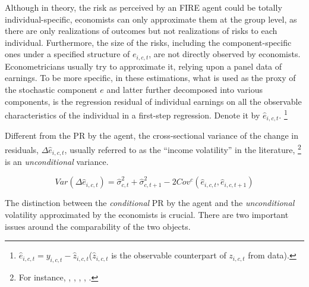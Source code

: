 Although in theory, the risk as perceived by an FIRE agent could be totally individual-specific, economists can only approximate them at the group level, as there are only realizations of outcomes but not realizations of risks to each individual. Furthermore, the size of the risks, including the component-specific ones under a specified structure of $e_{i,c,t}$, are not directly observed by economists.  Econometricians 
usually try to approximate it, relying upon a panel data of earnings. To be more specific, in these estimations, what is used as the proxy of the stochastic component $e$ and latter further decomposed into various components, is the regression residual of individual earnings on all the observable characteristics of the individual in a first-step regression. Denote it by $\hat e_{i,c,t}$. \footnote{$\hat e_{i,c,t}= y_{i,c,t}-\hat z_{i,c,t}$($\hat z_{i,c,t}$ is the
observable counterpart of $z_{i,c,t}$ from data).} 


Different from the PR by the agent, the cross-sectional variance of the change in residuals, $\Delta \hat e_{i,c,t}$, usually referred to as the ``income volatility'' in the literature, \footnote{For instance, \cite{gottschalk1994growth}, \cite{moffitt2002trends}, \cite{sabelhaus2010great}, \cite{dynan2012evolution}, \cite{bloom2018great}.} is an  \emph{unconditional} variance. 

\begin{equation}
Var(\Delta \hat e_{i,c,t}) = \hat\sigma^2_{c,t}+ \hat\sigma^2_{c,t+1} - 2Cov^c(\hat e_{i,c,t},\hat e_{i,c,t+1})
\end{equation}


The distinction between the \emph{conditional} PR by the agent and the \emph{unconditional} volatility approximated by the economists is crucial. There are two important issues around the comparability of the two objects. 

